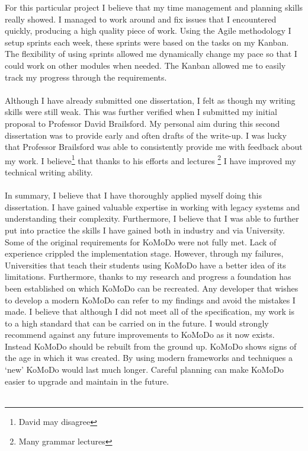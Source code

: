 %
For this particular project I believe that my time management and planning skills really showed. I managed to work around and fix issues that I encountered quickly, producing a high quality piece of work. Using the Agile methodology I setup sprints each week, these sprints were based on the tasks on my Kanban. The flexibility of using sprints allowed me dynamically change my pace so that I could work on other modules when needed. The Kanban allowed me to easily track my progress through the requirements.\\\\
%
Although I have already submitted one dissertation, I felt as though my writing skills were still weak. This was further verified when I submitted my initial proposal to Professor David Brailsford. My personal aim during this second dissertation was to provide early and often drafts of the write-up. I was lucky that Professor Brailsford was able to consistently provide me with feedback about my work. I believe\footnote{David may disagree} that thanks to his efforts and lectures \footnote{Many grammar lectures} I have improved my technical writing ability.\\\\
%
In summary, I believe that I have thoroughly applied myself doing this dissertation. I have gained valuable expertise in working with legacy systems and understanding their complexity. Furthermore, I believe that I was able to further put into practice the skills I have gained both in industry and via University.
%
%
%
Some of the original requirements for KoMoDo were not fully met. Lack of experience crippled the implementation stage. However, through my failures, Universities that teach their students using KoMoDo have a better idea of its limitations. Furthermore, thanks to my research and progress a foundation has been established on which KoMoDo can be recreated. Any developer that wishes to develop a modern KoMoDo can refer to my findings and avoid the mistakes I made. I believe that although I did not meet all of the specification, my work is to a high standard that can be carried on in the future.
%
%
%
I would strongly recommend against any future improvements to KoMoDo as it now exists. Instead KoMoDo should be rebuilt from the ground up. KoMoDo shows signs of the age in which it was created. By using modern frameworks and techniques a `new' KoMoDo would last much longer. Careful planning can make KoMoDo easier to upgrade and maintain in the future.\\\\

